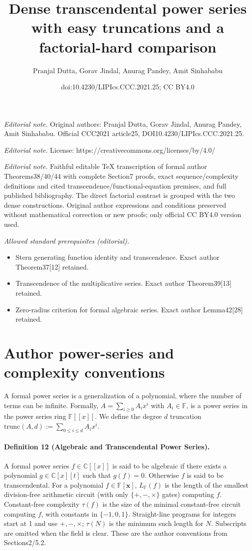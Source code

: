 \documentclass[10pt,a4paper]{article}
\title{Dense transcendental power series with easy truncations and a factorial-hard comparison}
\author{Pranjal Dutta, Gorav Jindal, Anurag Pandey, Amit Sinhababu}
\date{doi:10.4230/LIPIcs.CCC.2021.25; CC BY4.0}
\begin{document}
\maketitle
\noindent\textit{Editorial note.} Original authors: Pranjal Dutta, Gorav Jindal, Anurag Pandey, Amit Sinhababu. Official CCC2021 article25, DOI10.4230/LIPIcs.CCC.2021.25.\par\medskip
\noindent\textit{Editorial note.} License: https://creativecommons.org/licenses/by/4.0/\par\medskip
\noindent\textit{Editorial note.} Faithful editable TeX transcription of formal author Theorems38/40/44 with complete Section7 proofs, exact sequence/complexity definitions and cited transcendence/functional-equation premises, and full published bibliography. The direct factorial contrast is grouped with the two dense constructions. Original author expressions and conditions preserved without mathematical correction or new proofs; only official CC BY4.0 version used.\par\medskip
\noindent\textit{Allowed standard prerequisites (editorial).}\begin{itemize}
\item Stern generating function identity and transcendence. Exact author Theorem37[12] retained.
\item Transcendence of the multiplicative series. Exact author Theorem39[13] retained.
\item Zero-radius criterion for formal algebraic series. Exact author Lemma42[28] retained.
\end{itemize}\medskip
\section*{Author power-series and complexity conventions}
A formal power series is a generalization of a polynomial, where the number of terms can be infinite. Formally, $A=\sum_{i\ge0}A_ix^i$ with $A_i\in\mathbb F$, is a power series in the power series ring $\mathbb F[[x]]$. We define the degree $d$ truncation $\mathrm{trunc}(A,d):=\sum_{0\le i\le d}A_ix^i$.
\paragraph{Definition 12 (Algebraic and Transcendental Power Series).} A formal power series $f\in\mathbb C[[x]]$ is said to be algebraic if there exists a polynomial $g\in\mathbb C[x][t]$ such that $g(f)=0$. Otherwise $f$ is said to be transcendental.
For a polynomial $f\in\mathbb F[\mathbf x]$, $L_{\mathbb F}(f)$ is the length of the smallest division-free arithmetic circuit (with only $\{+,-,\times\}$ gates) computing $f$. Constant-free complexity $\tau(f)$ is the size of the minimal constant-free circuit computing $f$, with constants in $\{-1,0,1\}$. Straight-line programs for integers start at 1 and use $+,-,\times$; $\tau(N)$ is the minimum such length for $N$. Subscripts are omitted when the field is clear. These are the author conventions from Sections2/5.2.
\end{document}
